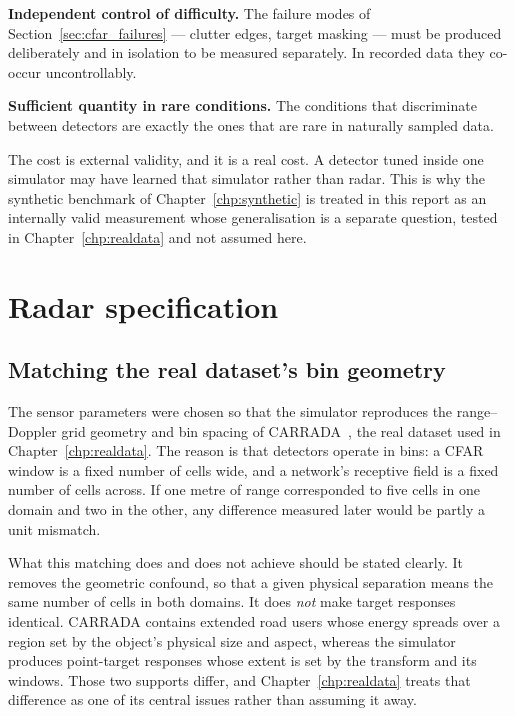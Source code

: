\textbf{Independent control of difficulty.} The failure modes of
Section~\ref{sec:cfar_failures} --- clutter edges, target masking --- must be produced deliberately
and in isolation to be measured separately. In recorded data they co-occur uncontrollably.

\textbf{Sufficient quantity in rare conditions.} The conditions that discriminate between detectors
are exactly the ones that are rare in naturally sampled data.

The cost is external validity, and it is a real cost. A detector tuned inside one simulator may
have learned that simulator rather than radar. This is why the synthetic benchmark of
Chapter~\ref{chp:synthetic} is treated in this report as an internally valid measurement whose
generalisation is a separate question, tested in Chapter~\ref{chp:realdata} and not assumed here.

\section{Radar specification}
\label{sec:carrada_spec}

\subsection{Matching the real dataset's bin geometry}

The sensor parameters were chosen so that the simulator reproduces the range--Doppler grid geometry
and bin spacing of CARRADA~\cite{ouaknine2021carrada}, the real dataset used in
Chapter~\ref{chp:realdata}. The reason is that detectors operate in bins: a CFAR window is a fixed
number of cells wide, and a network's receptive field is a fixed number of cells across. If one
metre of range corresponded to five cells in one domain and two in the other, any difference
measured later would be partly a unit mismatch.

What this matching does and does not achieve should be stated clearly. It removes the geometric
confound, so that a given physical separation means the same number of cells in both domains. It
does \emph{not} make target responses identical. CARRADA contains extended road users whose energy
spreads over a region set by the object's physical size and aspect, whereas the simulator produces
point-target responses whose extent is set by the transform and its windows. Those two supports
differ, and Chapter~\ref{chp:realdata} treats that difference as one of its central issues rather
than assuming it away.

